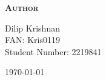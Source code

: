\begin{titlepage}
\begin{center}
    \textsc{\Large\textbf{Author}}\\
    \vspace{.5cm}
    \centering

    \begingroup %
    \large
    Dilip Krishnan\\
    FAN: Kris0119\\
    Student Number: 2219841\\
    \endgroup

    \vspace{2.5cm}
    
    \centering \today %
    \end{center}
    \end{titlepage}


